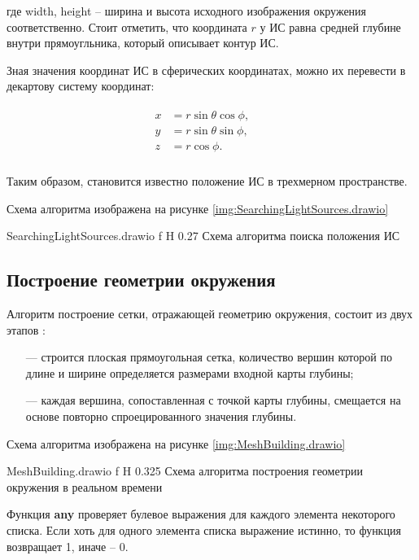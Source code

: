 где width, height -- ширина и высота исходного изображения окружения соответственно. Стоит отметить, что координата $r$ у ИС равна средней глубине внутри прямоугльника, который описывает контур ИС.

Зная значения координат ИС в сферических координатах, можно их перевести в декартову систему координат:

\begin{equation}
	\begin{aligned}
		\begin{split}
			x &= r \sin\theta \cos\phi, &&\\
			y &= r \sin\theta \sin\phi, &&\\
			z &= r \cos\phi. &&\\
		\end{split}
	\end{aligned}
\end{equation}

Таким образом, становится известно положение ИС в трехмерном пространстве.

Схема алгоритма изображена на рисунке \ref{img:SearchingLightSources.drawio}

{SearchingLightSources.drawio}
{f}
{H}
{0.27\textwidth}
{Схема алгоритма поиска положения ИС}

\subsection{Построение геометрии окружения}

Алгоритм построение сетки, отражающей геометрию окружения, состоит из двух этапов \cite{du2020depthlab}: 

\begin{itemize}
	\item[---] строится плоская прямоугольная сетка, количество вершин которой по длине и ширине определяется размерами входной карты глубины;
	\item[---] каждая вершина, сопоставленная с точкой карты глубины, смещается на основе повторно спроецированного значения глубины.
\end{itemize}

Схема алгоритма изображена на рисунке \ref{img:MeshBuilding.drawio}

{MeshBuilding.drawio}
{f}
{H}
{0.325\textwidth}
{Схема алгоритма построения геометрии окружения в реальном времени}

Функция \textbf{any} проверяет булевое выражения для каждого элемента некоторого списка. Если хоть для одного элемента списка выражение истинно, то функция возвращает 1, иначе -- 0.

